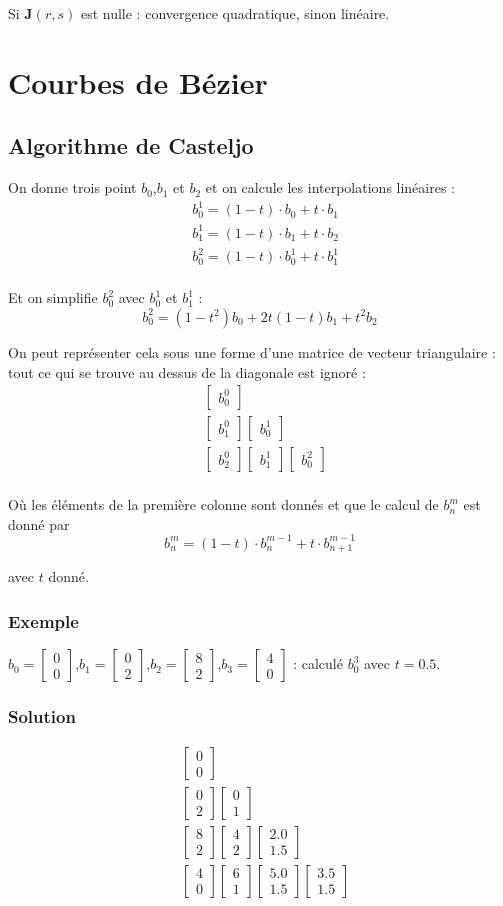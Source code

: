 \documentclass[a4paper,9pt]{extarticle}
\newcommand{\matv}[2]{\begin{bmatrix}#1 \\ #2 \end{bmatrix}}
\newcommand{\mato}[1]{\begin{bmatrix}#1\end{bmatrix}}
\begin{document}
Si $\textbf{J}(r,s)$ est nulle : convergence quadratique, sinon linéaire.

\chapter{Courbes de Bézier}

\section{Algorithme de Casteljo}

On donne trois point $b_0$,$b_1$ et $b_2$ et on calcule les interpolations linéaires :
\begin{align*}
& b_0^1 = (1-t)\cdot b_0 + t \cdot b_1    \\
& b_1^1 = (1-t)\cdot b_1 + t \cdot b_2    \\
& b_0^2 = (1-t)\cdot b_0^1 + t \cdot b_1^1\\
\end{align*}

Et on simplifie $b_0^2$ avec $b_0^1$ et $b_1^1$ :
$$
b_0^2 = (1-t^2)b_0 + 2t(1-t)b_1 + t^2b_2
$$

On peut représenter cela sous une forme d'une matrice de vecteur triangulaire : tout ce qui se trouve au dessus de la diagonale est ignoré :
\begin{align*}
& \mato{b_0^0} \\
& \mato{b_1^0} \mato{b_0^1}\\
& \mato{b_2^0} \mato{b_1^1} \mato{b_0^2}\\
\end{align*}

Où les éléments de la première colonne sont donnés et que le calcul de $b_{n}^{m}$ est donné par 
$$
b_{n}^{m} = (1-t) \cdot b_{n}^{m-1} + t \cdot b_{n+1}^{m-1}
$$

avec $t$ donné.

\subsection*{Exemple}
$b_0 = \matv{0}{0}$,$b_1 = \matv{0}{2}$,$b_2 = \matv{8}{2}$,$b_3 = \matv{4}{0}$ : calculé $b^3_0$ avec $t=0.5$.
\subsection*{Solution}
\begin{align*}
& \matv{0}{0} \\
& \matv{0}{2} \matv{0}{1} \\
& \matv{8}{2} \matv{4}{2} \matv{2.0}{1.5} \\
& \matv{4}{0} \matv{6}{1} \matv{5.0}{1.5} \matv{3.5}{1.5} \\
\end{align*}
\end{document}
